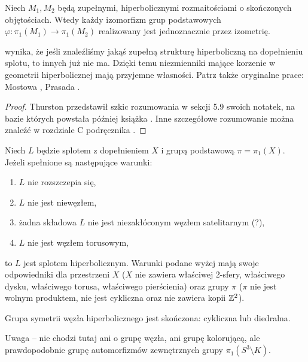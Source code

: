 \begin{theorem}
    Niech $M_1, M_2$ będą zupełnymi, hiperbolicznymi rozmaitościami o skończonych objętościach.
    Wtedy każdy izomorfizm grup podstawowych $\varphi \colon \pi_1(M_1) \to \pi_1(M_2)$ realizowany jest jednoznacznie przez izometrię.
\end{theorem}

wynika, że jeśli znaleźliśmy jakąś zupełną strukturę hiperboliczną na dopełnieniu splotu, to innych już nie ma. 
Dzięki temu niezmienniki mające korzenie w geometrii hiperbolicznej mają przyjemne własności.
Patrz także oryginalne prace: Mostowa \cite{mostow73}, Prasada \cite{prasad73}.

\begin{proof}
    Thurston przedstawił szkic rozumowania w sekcji 5.9 swoich notatek, na bazie których powstała później książka \cite{thurston97}.
    Inne szczegółowe rozumowanie można znaleźć w rozdziale C podręcznika \cite{benedetti92}.
\end{proof}


\begin{tobedone}
    Niech $L$ będzie splotem z dopełnieniem $X$ i grupą podstawową $\pi = \pi_1(X)$.
    Jeżeli spełnione są następujące warunki:
    \begin{enumerate}
    \item $L$ nie rozszczepia się,
    \item $L$ nie jest niewęzłem,
    \item żadna składowa $L$ nie jest niezakłóconym węzłem satelitarnym (?),
    \item $L$ nie jest węzłem torusowym,
    \end{enumerate}
    to $L$ jest splotem hiperbolicznym.
    Warunki podane wyżej mają swoje odpowiedniki dla przestrzeni $X$ ($X$ nie zawiera właściwej 2-sfery, właściwego dysku, właściwego torusa, właściwego pierścienia) oraz grupy $\pi$ ($\pi$ nie jest wolnym produktem, nie jest cykliczna oraz nie zawiera kopii $\mathbb Z^2$).
\end{tobedone}

\begin{proposition}
    Grupa symetrii węzła hiperbolicznego jest skończona: cykliczna lub diedralna.
\end{proposition}

Uwaga -- nie chodzi tutaj ani o grupę węzła, ani grupę kolorującą, ale prawdopodobnie grupę automorfizmów zewnętrznych grupy $\pi_1(S^3 \setminus K)$.

